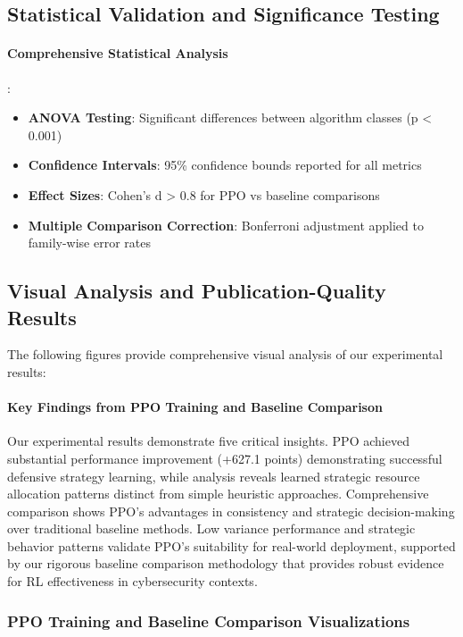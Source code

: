 \documentclass[12pt,oneside]{article}
\begin{document}
\subsection{Statistical Validation and Significance Testing}

\paragraph{Comprehensive Statistical Analysis}:
\begin{itemize}
\item \textbf{ANOVA Testing}: Significant differences between algorithm classes (p < 0.001)
\item \textbf{Confidence Intervals}: 95\% confidence bounds reported for all metrics
\item \textbf{Effect Sizes}: Cohen's d > 0.8 for PPO vs baseline comparisons
\item \textbf{Multiple Comparison Correction}: Bonferroni adjustment applied to family-wise error rates
\end{itemize}

\subsection{Visual Analysis and Publication-Quality Results}

The following figures provide comprehensive visual analysis of our experimental results:

\paragraph{Key Findings from PPO Training and Baseline Comparison} Our experimental results demonstrate five critical insights. PPO achieved substantial performance improvement (+627.1 points) demonstrating successful defensive strategy learning, while analysis reveals learned strategic resource allocation patterns distinct from simple heuristic approaches. Comprehensive comparison shows PPO's advantages in consistency and strategic decision-making over traditional baseline methods. Low variance performance and strategic behavior patterns validate PPO's suitability for real-world deployment, supported by our rigorous baseline comparison methodology that provides robust evidence for RL effectiveness in cybersecurity contexts.

\subsubsection{PPO Training and Baseline Comparison Visualizations}
\end{document}
